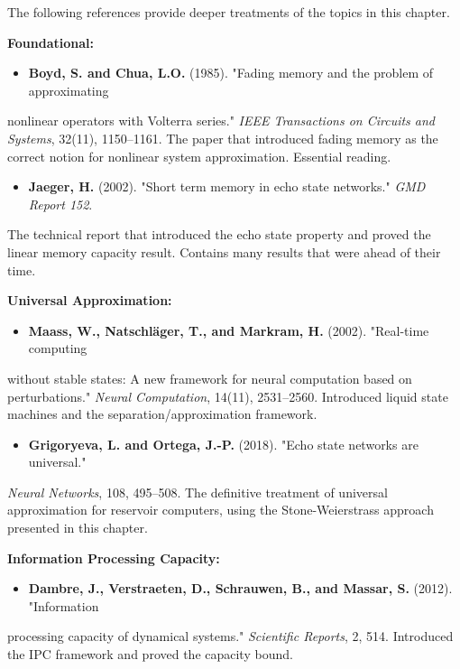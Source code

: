 The following references provide deeper treatments of the topics in this chapter.

\textbf{Foundational:}
\begin{itemize}[nosep]
  \item \textbf{Boyd, S. and Chua, L.O.} (1985). "Fading memory and the problem of approximating
\end{itemize}
  nonlinear operators with Volterra series." \textit{IEEE Transactions on Circuits and Systems},
  32(11), 1150--1161. The paper that introduced fading memory as the correct notion
  for nonlinear system approximation. Essential reading.

\begin{itemize}[nosep]
  \item \textbf{Jaeger, H.} (2002). "Short term memory in echo state networks." \textit{GMD Report 152}.
\end{itemize}
  The technical report that introduced the echo state property and proved the linear
  memory capacity result. Contains many results that were ahead of their time.

\textbf{Universal Approximation:}
\begin{itemize}[nosep]
  \item \textbf{Maass, W., Natschl\"ager, T., and Markram, H.} (2002). "Real-time computing
\end{itemize}
  without stable states: A new framework for neural computation based on
  perturbations." \textit{Neural Computation}, 14(11), 2531--2560. Introduced liquid state
  machines and the separation/approximation framework.

\begin{itemize}[nosep]
  \item \textbf{Grigoryeva, L. and Ortega, J.-P.} (2018). "Echo state networks are universal."
\end{itemize}
  \textit{Neural Networks}, 108, 495--508. The definitive treatment of universal approximation
  for reservoir computers, using the Stone-Weierstrass approach presented in this chapter.

\textbf{Information Processing Capacity:}
\begin{itemize}[nosep]
  \item \textbf{Dambre, J., Verstraeten, D., Schrauwen, B., and Massar, S.} (2012). "Information
\end{itemize}
  processing capacity of dynamical systems." \textit{Scientific Reports}, 2, 514. Introduced
  the IPC framework and proved the capacity bound.

